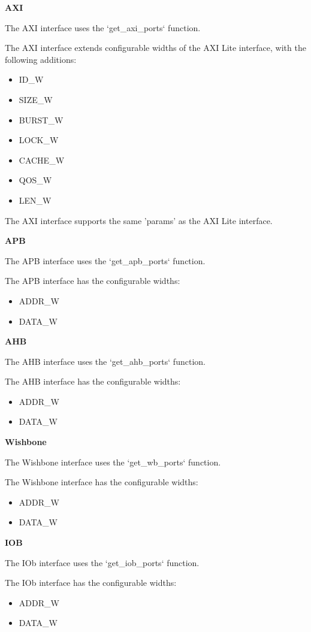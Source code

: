 %
%
\clearpage
\large\textbf{AXI}

The AXI interface uses the `get\_axi\_ports` function.


The AXI interface extends configurable widths of the AXI Lite interface, with the following additions:
\begin{itemize}
  \item ID\_W
  \item SIZE\_W
  \item BURST\_W
  \item LOCK\_W
  \item CACHE\_W
  \item QOS\_W
  \item LEN\_W
\end{itemize}

The AXI interface supports the same 'params' as the AXI Lite interface.

%
%
\clearpage
\large\textbf{APB}

The APB interface uses the `get\_apb\_ports` function.


The APB interface has the configurable widths:
\begin{itemize}
  \item ADDR\_W
  \item DATA\_W
\end{itemize}

%
%
\clearpage
\large\textbf{AHB}

The AHB interface uses the `get\_ahb\_ports` function.


The AHB interface has the configurable widths:
\begin{itemize}
  \item ADDR\_W
  \item DATA\_W
\end{itemize}

%
%
\clearpage
\large\textbf{Wishbone}

The Wishbone interface uses the `get\_wb\_ports` function.


The Wishbone interface has the configurable widths:
\begin{itemize}
  \item ADDR\_W
  \item DATA\_W
\end{itemize}

%
%
\clearpage
\large\textbf{IOB}

The IOb interface uses the `get\_iob\_ports` function.


The IOb interface has the configurable widths:
\begin{itemize}
  \item ADDR\_W
  \item DATA\_W
\end{itemize}

